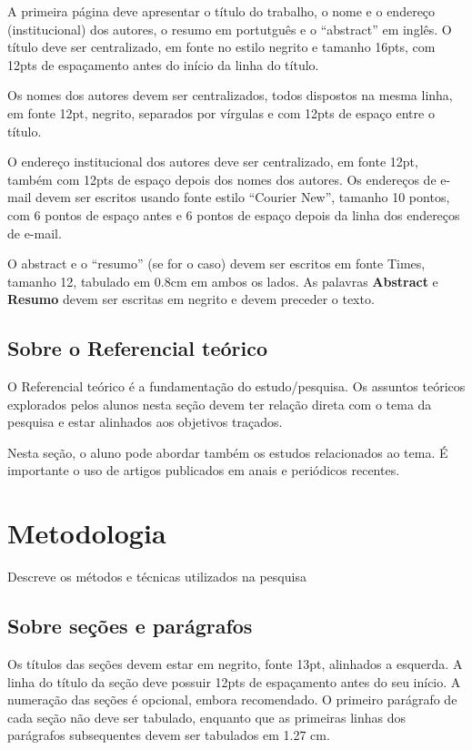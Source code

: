 \documentclass[12pt]{article}
\begin{document}
A primeira página deve apresentar o título do trabalho, o nome e o endereço (institucional) dos autores, o resumo em portutguês e o “abstract” em inglês. O título deve ser centralizado, em fonte no estilo negrito e tamanho 16pts, com 12pts de espaçamento antes do início da linha do título. 

Os nomes dos autores devem ser centralizados, todos dispostos na mesma linha, em fonte 12pt, negrito, separados por vírgulas e com 12pts de espaço entre o título. 

O endereço institucional dos autores deve ser centralizado, em fonte 12pt, também com 12pts de espaço depois dos nomes dos autores. Os endereços de e-mail devem ser escritos usando fonte estilo “Courier New”, tamanho 10 pontos, com 6 pontos de espaço antes e 6 pontos de espaço depois da linha dos endereços de e-mail.

O abstract e o “resumo” (se for o caso) devem ser escritos em fonte Times, tamanho 12, tabulado em 0.8cm em ambos os lados. As palavras \textbf{Abstract} e \textbf{Resumo} devem ser escritas em negrito e devem preceder o texto.

\subsection{Sobre o Referencial teórico}
O Referencial teórico é a fundamentação do estudo/pesquisa. Os assuntos teóricos explorados pelos alunos nesta seção devem ter relação direta com o tema da pesquisa e estar alinhados aos objetivos traçados.

Nesta seção, o aluno pode abordar também os estudos relacionados ao tema. É importante o uso de artigos publicados em anais e periódicos recentes.


\section{Metodologia}

Descreve os métodos e técnicas utilizados na pesquisa

\subsection{Sobre seções e parágrafos}

Os títulos das seções devem estar em negrito, fonte 13pt, alinhados a esquerda. A linha do título da seção deve possuir 12pts de espaçamento antes do seu início. A numeração das seções é opcional, embora recomendado. O primeiro parágrafo de cada seção não deve ser tabulado, enquanto que as primeiras linhas dos parágrafos subsequentes devem ser tabulados em 1.27 cm.
\end{document}

